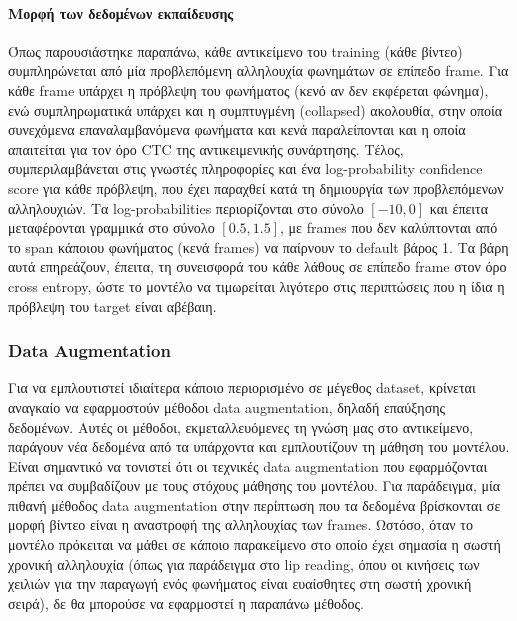 \paragraph{Μορφή των δεδομένων εκπαίδευσης}

Όπως παρουσιάστηκε παραπάνω, κάθε αντικείμενο του training (κάθε βίντεο) συμπληρώνεται από μία προβλεπόμενη αλληλουχία φωνημάτων σε επίπεδο frame. Για κάθε frame υπάρχει η πρόβλεψη του φωνήματος (κενό αν δεν εκφέρεται φώνημα), ενώ συμπληρωματικά υπάρχει και η συμπτυγμένη (collapsed) ακολουθία, στην οποία συνεχόμενα επαναλαμβανόμενα φωνήματα και κενά παραλείπονται και η οποία απαιτείται για τον όρο CTC της αντικειμενικής συνάρτησης. Τέλος, συμπεριλαμβάνεται στις γνωστές πληροφορίες και ένα log-probability confidence score για κάθε πρόβλεψη, που έχει παραχθεί κατά τη δημιουργία των προβλεπόμενων αλληλουχιών. Τα log-probabilities περιορίζονται στο σύνολο $[-10,0]$ και έπειτα μεταφέρονται γραμμικά στο σύνολο $[0.5,1.5]$, με frames που δεν καλύπτονται από το span κάποιου φωνήματος (κενά frames) να παίρνουν το default βάρος 1. Τα βάρη αυτά επηρεάζουν, έπειτα, τη συνεισφορά του κάθε λάθους σε επίπεδο frame στον όρο cross entropy, ώστε το μοντέλο να τιμωρείται λιγότερο στις περιπτώσεις που η ίδια η πρόβλεψη του target είναι αβέβαιη.

\subsubsection{Data Augmentation}

Για να εμπλουτιστεί ιδιαίτερα κάποιο περιορισμένο σε μέγεθος dataset, κρίνεται αναγκαίο να εφαρμοστούν μέθοδοι data augmentation, δηλαδή επαύξησης δεδομένων. Αυτές οι μέθοδοι, εκμεταλλευόμενες τη γνώση μας στο αντικείμενο, παράγουν νέα δεδομένα από τα υπάρχοντα και εμπλουτίζουν τη μάθηση του μοντέλου. Είναι σημαντικό να τονιστεί ότι οι τεχνικές data augmentation που εφαρμόζονται πρέπει να συμβαδίζουν με τους στόχους μάθησης του μοντέλου. Για παράδειγμα, μία πιθανή μέθοδος data augmentation στην περίπτωση που τα δεδομένα βρίσκονται σε μορφή βίντεο είναι η αναστροφή της αλληλουχίας των frames. Ωστόσο, όταν το μοντέλο πρόκειται να μάθει σε κάποιο παρακείμενο στο οποίο έχει σημασία η σωστή χρονική αλληλουχία (όπως για παράδειγμα στο lip reading, όπου οι κινήσεις των χειλιών για την παραγωγή ενός φωνήματος είναι ευαίσθητες στη σωστή χρονική σειρά), δε θα μπορούσε να εφαρμοστεί η παραπάνω μέθοδος.

